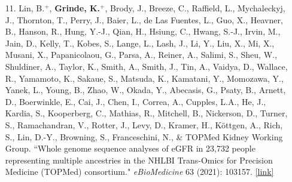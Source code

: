 \documentclass[margin]{res}
\begin{document}
\begin{resume}
\begin{itemize}
\item[11.] Lin, B.$^{+}$, \textbf{Grinde, K.}$^{+}$, Brody, J., Breeze, C., Raffield, L., Mychaleckyj, J., Thornton, T., Perry, J., Baier, L., de Las Fuentes, L., Guo, X., Heavner, B., Hanson, R.,  Hung, Y.-J., Qian, H.,  Hsiung, C., Hwang, S.-J., Irvin, M., Jain, D., Kelly, T., Kobes, S.,  Lange, L., Lash, J.,  Li, Y.,  Liu, X.,  Mi, X., Musani, X., Papanicolaou, G., Parsa, A., Reiner, A., Salimi, S., Sheu, W., Shuldiner, A., Taylor, K., Smith, A., Smith, J., Tin, A., Vaidya, D., Wallace, R., Yamamoto, K., Sakaue, S., Matsuda, K.,  Kamatani, Y.,  Momozawa, Y., Yanek, L., Young, B.,  Zhao, W.,  Okada, Y.,  Abecasis, G., Psaty, B.,  Arnett, D.,  Boerwinkle, E.,  Cai, J., Chen, I., Correa, A., Cupples, L.A.,  He, J., Kardia, S.,  Kooperberg, C., Mathias, R., Mitchell, B., Nickerson, D., Turner, S., Ramachandran, V., Rotter, J., Levy, D.,  Kramer, H.,  Köttgen, A., Rich, S., Lin, D.-Y., Browning, S., Franceschini, N., \& TOPMed Kidney Working Group. ``Whole genome sequence analyses of eGFR in 23,732 people representing multiple ancestries in the NHLBI Trans-Omics for Precision Medicine (TOPMed) consortium." \textit{eBioMedicine} 63 (2021): 103157.
\href{https://www.thelancet.com/journals/ebiom/article/PIIS2352-3964(20)30533-8/fulltext}{[link]}


\end{itemize}
\end{resume}
\end{document}
